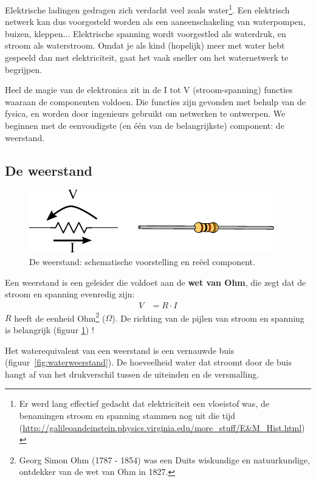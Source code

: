 \documentclass{article}
\begin{document}
		 Elektrische ladingen gedragen zich verdacht veel zoals water\footnote{Er werd lang effectief gedacht dat elektriciteit een vloeistof was, de benamingen stroom en spanning stammen nog uit die tijd (\url{http://galileoandeinstein.physics.virginia.edu/more_stuff/E&M_Hist.html})}.
		Een elektrisch netwerk kan dus voorgesteld worden als een aaneenschakeling van waterpompen, buizen, kleppen... Elektrische spanning wordt voorgestled als waterdruk, en stroom als waterstroom. Omdat je als kind (hopelijk) meer met water hebt gespeeld dan met elektriciteit, gaat het vaak sneller om het waternetwerk te begrijpen.


		Heel de magie van de elektronica zit in de I tot V (stroom-spanning) functies waaraan de componenten voldoen. Die functies zijn gevonden met behulp van de fysica, en worden door ingenieurs gebruikt om netwerken te ontwerpen. We beginnen met de eenvoudigste (en \'e\'en van de belangrijkste) component: de weerstand.

		\subsection{De weerstand}
			\begin{figure}[htbp]
				\centering
				\includegraphics{weerstand}
				\caption{De weerstand: schematische voorstelling en re\"eel component.}
				\label{fig:weerstand}
			\end{figure}
			 Een weerstand is een geleider die voldoet aan de \textbf{wet van Ohm}, die zegt dat de stroom en spanning evenredig zijn: 
			\begin{align}
				V &= R \cdot I
			\end{align} 
			$R$ heeft de eenheid Ohm\footnote{Georg Simon Ohm (1787 - 1854) was een Duits wiskundige en natuurkundige, ontdekker van de wet van Ohm in 1827.} ($\Omega$). De richting van de pijlen van stroom en spanning is belangrijk (figuur \ref{fig:weerstand}) !

			Het waterequivalent van een weerstand is een vernauwde buis (figuur~\ref{fig:waterweerstand}). De hoeveelheid water dat stroomt door de buis hangt af van het drukverschil tussen de uiteinden en de versmalling.
\end{document}
